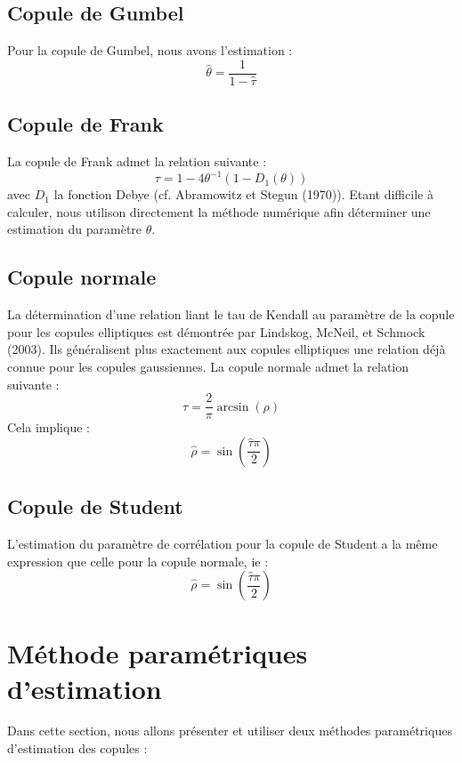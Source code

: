 \subsection{Copule de Gumbel}

Pour la copule de Gumbel, nous avons l'estimation :
$$
\widehat{\theta} = \frac{1}{1-\widehat{\tau}}
$$

\subsection{Copule de Frank}

La copule de Frank admet la relation suivante :
$$
\tau = 1 - 4 \theta^{-1} (1-D_1(\theta))
$$
avec $D_1$ la fonction Debye (cf. Abramowitz et Stegun (1970)). Etant difficile à calculer, nous utilison directement la méthode numérique 
afin déterminer une estimation du paramètre $\theta$.


\subsection{Copule normale}

La détermination d'une relation liant le tau de Kendall au paramètre de la copule pour les copules elliptiques est démontrée par Lindskog, McNeil,
et Schmock (2003). Ils généralisent plus exactement aux copules elliptiques une relation déjà connue
pour les copules gaussiennes. 
La copule normale admet la relation suivante :
$$
\tau = \frac{2}{\pi} \operatorname{arcsin}(\rho)
$$
Cela implique :
$$
\widehat{\rho} = \operatorname{sin}\left(\frac{\widehat{\tau} \pi}{2} \right)
$$


\subsection{Copule de Student}

L'estimation du paramètre de corrélation pour la copule de Student a la même expression que celle pour la copule normale, ie :
$$
\widehat{\rho} = \operatorname{sin}\left(\frac{\widehat{\tau} \pi}{2} \right)
$$

\section{Méthode paramétriques d'estimation}

Dans cette section, nous allons présenter et utiliser deux méthodes paramétriques d'estimation
des copules :

